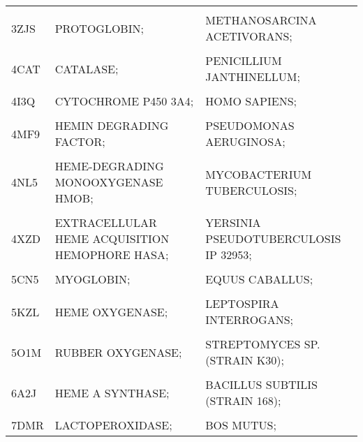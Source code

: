 \begin{table}
{\begin{tabular}{lll}
			\cellcolor{gray!6}{3VP5} & \cellcolor{gray!6}{TRANSCRIPTIONAL REGULATOR;} & \cellcolor{gray!6}{LACTOCOCCUS LACTIS;}\\
			3ZJS & PROTOGLOBIN; & METHANOSARCINA ACETIVORANS;\\
			\cellcolor{gray!6}{4B8N} & \cellcolor{gray!6}{CYTOCHROME B5-HOST ORIGIN;} & \cellcolor{gray!6}{OSTREOCOCCUS TAURI VIRUS 2;}\\
			4CAT & CATALASE; & PENICILLIUM JANTHINELLUM;\\
			\addlinespace
			\cellcolor{gray!6}{4CDP} & \cellcolor{gray!6}{PUTATIVE HEME/HEMOGLOBIN TRANSPORT PROTEIN;} & \cellcolor{gray!6}{ESCHERICHIA COLI;}\\
			4I3Q & CYTOCHROME P450 3A4; & HOMO SAPIENS;\\
			\cellcolor{gray!6}{4JET} & \cellcolor{gray!6}{HEMOPHORE HASA;} & \cellcolor{gray!6}{YERSINIA PESTIS;}\\
			4MF9 & HEMIN DEGRADING FACTOR; & PSEUDOMONAS AERUGINOSA;\\
			\cellcolor{gray!6}{4MYP} & \cellcolor{gray!6}{IRON-REGULATED SURFACE DETERMINANT PROTEIN A;} & \cellcolor{gray!6}{LISTERIA MONOCYTOGENES;}\\
			\addlinespace
			4NL5 & HEME-DEGRADING MONOOXYGENASE HMOB; & MYCOBACTERIUM TUBERCULOSIS;\\
			\cellcolor{gray!6}{4UZV} & \cellcolor{gray!6}{HEMOGLOBIN;} & \cellcolor{gray!6}{THERMOBIFIDA FUSCA TM51;}\\
			4XZD & EXTRACELLULAR HEME ACQUISITION HEMOPHORE HASA; & YERSINIA PSEUDOTUBERCULOSIS IP 32953;\\
			\cellcolor{gray!6}{4Y1Q} & \cellcolor{gray!6}{EXTRACELLULAR HEME ACQUISITION HEMOPHORE HASA;} & \cellcolor{gray!6}{YERSINIA PSEUDOTUBERCULOSIS IP 32953;}\\
			5CN5 & MYOGLOBIN; & EQUUS CABALLUS;\\
			\addlinespace
			\cellcolor{gray!6}{5GJ3} & \cellcolor{gray!6}{PERIPLASMIC BINDING PROTEIN;} & \cellcolor{gray!6}{ROSEIFLEXUS SP. RS-1;}\\
			5KZL & HEME OXYGENASE; & LEPTOSPIRA INTERROGANS;\\
			\cellcolor{gray!6}{5O1L} & \cellcolor{gray!6}{RUBBER OXYGENASE;} & \cellcolor{gray!6}{STREPTOMYCES SP. (STRAIN K30);}\\
			5O1M & RUBBER OXYGENASE; & STREPTOMYCES SP. (STRAIN K30);\\
			\cellcolor{gray!6}{5VEU} & \cellcolor{gray!6}{CYTOCHROME P450 3A5;} & \cellcolor{gray!6}{HOMO SAPIENS;}\\
			\addlinespace
			6A2J & HEME A SYNTHASE; & BACILLUS SUBTILIS (STRAIN 168);\\
			\cellcolor{gray!6}{7C74} & \cellcolor{gray!6}{LACTOPEROXIDASE;} & \cellcolor{gray!6}{BOS MUTUS;}\\
			7DMR & LACTOPEROXIDASE; & BOS MUTUS;\\
			\bottomrule
		\end{tabular}}
	\end{table}

